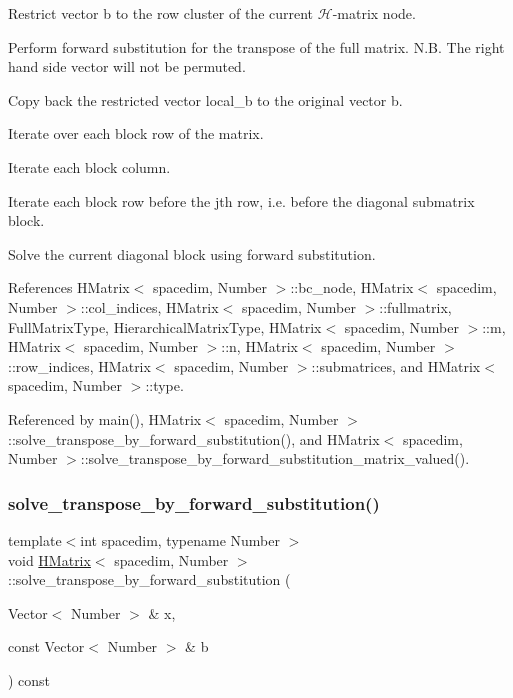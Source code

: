 Restrict vector {\ttfamily b} to the row cluster of the current $\mathcal{H}$-\/matrix node.

Perform forward substitution for the transpose of the full matrix. N.\+B. The right hand side vector will not be permuted.

Copy back the restricted vector {\ttfamily local\+\_\+b} to the original vector {\ttfamily b}.

Iterate over each block row of the matrix.

Iterate each block column.

Iterate each block row before the j\textquotesingle{}th row, i.\+e. before the diagonal submatrix block.

Solve the current diagonal block using forward substitution.

References H\+Matrix$<$ spacedim, Number $>$\+::bc\+\_\+node, H\+Matrix$<$ spacedim, Number $>$\+::col\+\_\+indices, H\+Matrix$<$ spacedim, Number $>$\+::fullmatrix, Full\+Matrix\+Type, Hierarchical\+Matrix\+Type, H\+Matrix$<$ spacedim, Number $>$\+::m, H\+Matrix$<$ spacedim, Number $>$\+::n, H\+Matrix$<$ spacedim, Number $>$\+::row\+\_\+indices, H\+Matrix$<$ spacedim, Number $>$\+::submatrices, and H\+Matrix$<$ spacedim, Number $>$\+::type.



Referenced by main(), H\+Matrix$<$ spacedim, Number $>$\+::solve\+\_\+transpose\+\_\+by\+\_\+forward\+\_\+substitution(), and H\+Matrix$<$ spacedim, Number $>$\+::solve\+\_\+transpose\+\_\+by\+\_\+forward\+\_\+substitution\+\_\+matrix\+\_\+valued().

\mbox{\label{classHMatrix_a94f9bb1bc4e584fc5f29541be6b85ef1}} 
\subsubsection{\texorpdfstring{solve\+\_\+transpose\+\_\+by\+\_\+forward\+\_\+substitution()}{solve\_transpose\_by\_forward\_substitution()}\hspace{0.1cm}{\footnotesize\ttfamily [2/4]}}
{\footnotesize\ttfamily template$<$int spacedim, typename Number $>$ \\
void \hyperlink{classHMatrix}{H\+Matrix}$<$ spacedim, Number $>$\+::solve\+\_\+transpose\+\_\+by\+\_\+forward\+\_\+substitution (\begin{DoxyParamCaption}\item[{Vector$<$ Number $>$ \&}]{x,  }\item[{const Vector$<$ Number $>$ \&}]{b }\end{DoxyParamCaption}) const}

